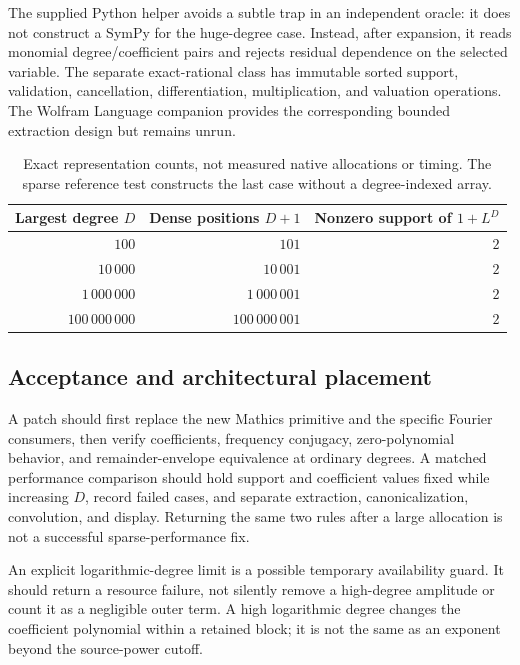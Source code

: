 \documentclass[11pt,a4paper]{article}
\newcommand{\code}[1]{\texttt{\detokenize{#1}}}
\theoremstyle{remark}
\begin{document}
The supplied Python helper avoids a subtle trap in an independent oracle: it does not construct a SymPy \code{Poly} for the huge-degree case. Instead, after expansion, it reads monomial degree/coefficient pairs and rejects residual dependence on the selected variable. The separate exact-rational \code{SparsePolynomial} class has immutable sorted support, validation, cancellation, differentiation, multiplication, and valuation operations. The Wolfram Language companion provides the corresponding bounded extraction design but remains unrun.

\setcounter{table}{0}
\begin{table}[htbp]
\centering
\begin{tabular}{rrr}
\toprule
Largest degree $D$ & Dense positions $D+1$ & Nonzero support of $1+L^D$\\\midrule
$100$ & $101$ & $2$\\
$10\,000$ & $10\,001$ & $2$\\
$1\,000\,000$ & $1\,000\,001$ & $2$\\
$100\,000\,000$ & $100\,000\,001$ & $2$\\
\bottomrule
\end{tabular}
\caption{Exact representation counts, not measured native allocations or timing. The sparse reference test constructs the last case without a degree-indexed array.}
\end{table}

\subsection{Acceptance and architectural placement}

A patch should first replace the new Mathics primitive and the specific Fourier consumers, then verify coefficients, frequency conjugacy, zero-polynomial behavior, and remainder-envelope equivalence at ordinary degrees. A matched performance comparison should hold support and coefficient values fixed while increasing $D$, record failed cases, and separate extraction, canonicalization, convolution, and display. Returning the same two rules after a large allocation is not a successful sparse-performance fix.

An explicit logarithmic-degree limit is a possible temporary availability guard. It should return a resource failure, not silently remove a high-degree amplitude or count it as a negligible outer term. A high logarithmic degree changes the coefficient polynomial within a retained block; it is not the same as an exponent beyond the source-power cutoff.
\end{document}
